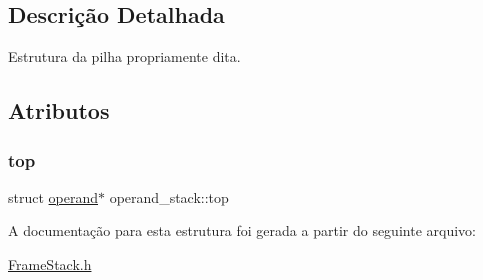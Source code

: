 \subsection{Descrição Detalhada}
Estrutura da pilha propriamente dita. 

\subsection{Atributos}
\mbox{\label{structoperand__stack_a39f0f405579d0f45a1d03b30b1c2731e}} 
\subsubsection{\texorpdfstring{top}{top}}
{\footnotesize\ttfamily struct \hyperlink{structoperand}{operand}$\ast$ operand\+\_\+stack\+::top}



A documentação para esta estrutura foi gerada a partir do seguinte arquivo\+:\begin{DoxyCompactItemize}
\item 
\hyperlink{FrameStack_8h}{Frame\+Stack.\+h}\end{DoxyCompactItemize}
